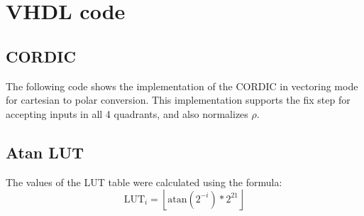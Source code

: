 \chapter{VHDL code}


\section{CORDIC}
The following code shows the implementation of the CORDIC in vectoring mode for cartesian to polar conversion. This implementation supports the fix step for accepting inputs in all 4 quadrants, and also normalizes \( \rho \).

\begin{code}
    \label{code:vhdl}
\end{code}


\section{Atan LUT}
The values of the LUT table were calculated using the formula:
\[
    \text{LUT}_i = \left\lfloor \text{atan}(2^{-i} )* 2^{21} \right\rfloor
\]
\begin{code}
    \label{code:lut}
\end{code}

